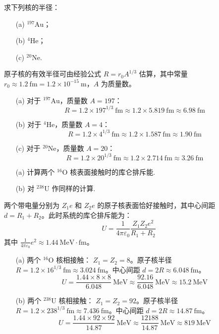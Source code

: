 \begin{exercise}\label{ex:29.2}
求下列核的半径：
\begin{enumerate}
  \item[(a)] $^{197}\mathrm{Au}$；
  \item[(b)] $^4\mathrm{He}$；
  \item[(c)] $^{20}\mathrm{Ne}$.
\end{enumerate}
\end{exercise}
\begin{solution}
原子核的有效半径可由经验公式 $R = r_0 A^{1/3}$ 估算，其中常量 $r_0 \approx 1.2 \ \mathrm{fm} = 1.2 \times 10^{-15} \ \mathrm{m}$，$A$ 为质量数。
\begin{enumerate}
    \item[(a)] 对于 $^{197}\mathrm{Au}$，质量数 $A = 197$：
    $$ R = 1.2 \times 197^{1/3} \ \mathrm{fm} \approx 1.2 \times 5.819 \ \mathrm{fm} \approx 6.98 \ \mathrm{fm} $$
    \item[(b)] 对于 $^4\mathrm{He}$，质量数 $A = 4$：
    $$ R = 1.2 \times 4^{1/3} \ \mathrm{fm} \approx 1.2 \times 1.587 \ \mathrm{fm} \approx 1.90 \ \mathrm{fm} $$
    \item[(c)] 对于 $^{20}\mathrm{Ne}$，质量数 $A = 20$：
    $$ R = 1.2 \times 20^{1/3} \ \mathrm{fm} \approx 1.2 \times 2.714 \ \mathrm{fm} \approx 3.26 \ \mathrm{fm} $$
\end{enumerate}
\end{solution}

\begin{exercise}\label{ex:29.3}
\begin{enumerate}
  \item[(a)] 计算两个 $^{16}\mathrm{O}$ 核表面接触时的库仑排斥能. 
  \item[(b)] 对 $^{238}\mathrm{U}$ 作同样的计算.
\end{enumerate}
\end{exercise}
\begin{solution}
两个带电量分别为 $Z_1 e$ 和 $Z_2 e$ 的原子核表面恰好接触时，其中心间距 $d = R_1 + R_2$。此时系统的库仑排斥能为：
$$ U = \frac{1}{4\pi\varepsilon_0} \frac{Z_1 Z_2 e^2}{R_1 + R_2} $$
其中 $\frac{1}{4\pi\varepsilon_0} e^2 \approx 1.44 \ \mathrm{MeV \cdot fm}$。

\begin{enumerate}
    \item[(a)] 两个 $^{16}\mathrm{O}$ 核相接触：
    $Z_1 = Z_2 = 8$。原子核半径 $R = 1.2 \times 16^{1/3} \ \mathrm{fm} \approx 3.024 \ \mathrm{fm}$。中心间距 $d = 2R \approx 6.048 \ \mathrm{fm}$。
    $$ U = \frac{1.44 \times 8 \times 8}{6.048} \ \mathrm{MeV} \approx \frac{92.16}{6.048} \ \mathrm{MeV} \approx 15.2 \ \mathrm{MeV} $$
    
    \item[(b)] 两个 $^{238}\mathrm{U}$ 核相接触：
    $Z_1 = Z_2 = 92$。原子核半径 $R = 1.2 \times 238^{1/3} \ \mathrm{fm} \approx 7.436 \ \mathrm{fm}$。中心间距 $d = 2R \approx 14.87 \ \mathrm{fm}$。
    $$ U = \frac{1.44 \times 92 \times 92}{14.87} \ \mathrm{MeV} \approx \frac{12188}{14.87} \ \mathrm{MeV} \approx 819 \ \mathrm{MeV} $$
\end{enumerate}
\end{solution}

